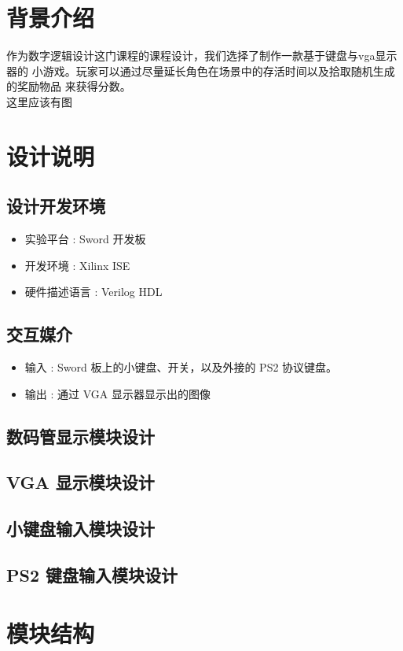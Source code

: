 \documentclass{ctexart}
\begin{document}
\newpage
\tableofcontents
\newpage
    \section{背景介绍}
	作为数字逻辑设计这门课程的课程设计，我们选择了制作一款基于键盘与vga显示器的
	小游戏。玩家可以通过尽量延长角色在场景中的存活时间以及拾取随机生成的奖励物品
	来获得分数。 \\
	这里应该有图
	\section{设计说明}
		\subsection{设计开发环境}
		\begin{itemize}
			\item 实验平台 : Sword 开发板
			\item 开发环境 : Xilinx ISE
			\item 硬件描述语言 : Verilog HDL
		\end{itemize}
		\subsection{交互媒介}
		\begin{itemize}
			\item 输入 : Sword 板上的小键盘、开关，以及外接的 PS2 协议键盘。
			\item 输出 : 通过 VGA 显示器显示出的图像
		\end{itemize}
        \subsection{数码管显示模块设计}
        \subsection{VGA 显示模块设计}
		\subsection{小键盘输入模块设计}
		\subsection{PS2 键盘输入模块设计}
		
    \section{模块结构}
\end{document}
